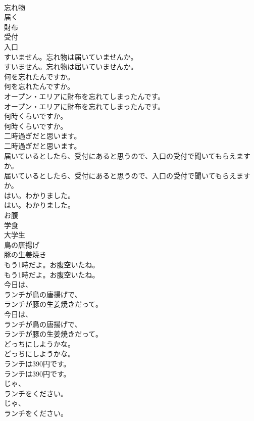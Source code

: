 \documentclass[8pt]{extreport}
\begin{document}
\begin{CJK}{UTF8}{min}
\\	忘れ物
\\	届く
\\	財布
\\	受付
\\	入口
\\	すいません。忘れ物は届いていませんか。	
\\	すいません。忘れ物は届いていませんか。 
\\	何を忘れたんですか。	
\\	何を忘れたんですか。 
\\	オープン・エリアに財布を忘れてしまったんです。	
\\	オープン・エリアに財布を忘れてしまったんです。 
\\	何時くらいですか。	
\\	何時くらいですか。 
\\	二時過ぎだと思います。	
\\	二時過ぎだと思います。 
\\	届いているとしたら、受付にあると思うので、入口の受付で聞いてもらえますか。	
\\	届いているとしたら、受付にあると思うので、入口の受付で聞いてもらえますか。 
\\	はい。わかりました。	
\\	はい。わかりました。 
\\	お腹
\\	学食
\\	大学生
\\	鳥の唐揚げ
\\	豚の生姜焼き
\\	もう1時だよ。お腹空いたね。	
\\	もう1時だよ。お腹空いたね。 
\\	今日は、
\\	ランチが鳥の唐揚げで、
\\	ランチが豚の生姜焼きだって。	
\\	今日は、
\\	ランチが鳥の唐揚げで、
\\	ランチが豚の生姜焼きだって。 
\\	どっちにしようかな。	
\\	どっちにしようかな。 
\\	ランチは390円です。	
\\	ランチは390円です。 
\\	じゃ、
\\	ランチをください。	
\\	じゃ、
\\	ランチをください。 

\end{CJK}
\end{document}
